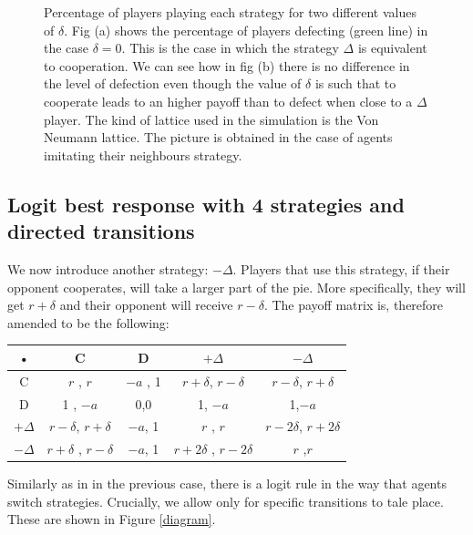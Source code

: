 \documentclass{article}
\begin{document}
\begin{figure}[htbp]
\begin{subfigure}[t]{0.47\textwidth}
  \label{fig:IM2_delta} 
\end{subfigure}
\caption{Percentage of players playing each strategy for two different values of $\delta$.
Fig (a) shows the percentage of players defecting (green line) in the case $\delta =0$. This is the case in which the strategy $\Delta$ is equivalent to cooperation.
We can see how in fig (b) there is no difference in the level of defection even though the value of $\delta$ is such that to cooperate leads to an higher payoff than to defect when close to a $\Delta$ player.
The kind of lattice used in the simulation is the Von Neumann lattice.
The picture is obtained in the case of agents imitating their neighbours strategy.
}
\label{fig:IM2}
\end{figure} 


\subsection{Logit best response with 4 strategies and directed transitions}
We now introduce another strategy: $-\Delta$. Players that use this strategy, if their opponent cooperates, will take a larger part of the pie. More specifically, they will get $r+\delta$ and their opponent will receive $r-\delta$. The payoff matrix is, therefore amended to be the following:
\begin{center}
\begin{tabular}{|c|c|c|c|c|}
\hline 
• & C & D &$+\Delta$ & $-\Delta$  \\ 
\hline 
C & $r$ , $r$ & $-a$ , 1 & $r+\delta$, $r-\delta$ & $r-\delta$, $r+\delta$ \\ 
\hline 
D & 1 , $-a$ & 0,0 & 1, $-a$ & 1,$-a$\\ 
\hline 
$+\Delta$ & $r -\delta$, $r+\delta$ & $-a$, 1 & $r$ , $r$& $r-2\delta$, $r+2\delta$ \\ 
\hline 
$-\Delta$ & $r+\delta$ , $r-\delta$ & $-a$, 1 & $r+2\delta$ , $r-2\delta$ & $r$ ,$ r$\\ 
\hline 
\end{tabular} 
\end{center}

Similarly as in in the previous case, there is a logit rule in the way that agents switch strategies. Crucially, we allow only for specific transitions to tale place. These are shown in Figure \ref{diagram}.  
\end{document}
